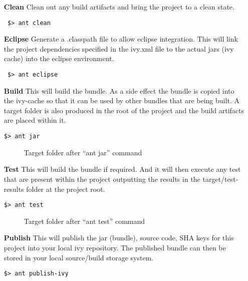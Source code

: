 \begin{itemize}
\item[\textbf{Clean}] Clean out any build artifacts and bring the project to a clean state.
\begin{verbatim}
 $> ant clean
\end{verbatim}
\item[\textbf{Eclipse}] Generate a .classpath file to allow eclipse integration. This will
link the project dependencies specified in the ivy.xml file to the actual jars
(ivy cache) into the eclipse environment.
\begin{verbatim}
 $> ant eclipse
\end{verbatim}
\item[\textbf{Build}] This will build the bundle. As a side effect the bundle is copied into
the ivy-cache so that it can be used by other bundles that are being built. A target folder
is also produced in the root of the project and the build artifacts are placed within it.
\begin{verbatim}
$> ant jar
\end{verbatim}
\begin{figure}[H]
\caption{Target folder after ``ant jar'' command}
\end{figure}

\item[\textbf{Test}] This will build the bundle if required. And it will then execute any test
that are present within the project outputting the results in the target/test-results folder
at the project root.
\begin{verbatim}
$> ant test
\end{verbatim}
\begin{figure}[H]
\caption{Target folder after ``ant test'' command}
\end{figure}
\item[\textbf{Publish}] This will publish the jar (bundle), source code, SHA keys for this
project into your local ivy repository. The published bundle can then be stored in your
local source/build storage system.
\begin{verbatim}
$> ant publish-ivy
\end{verbatim}
\end{itemize}


